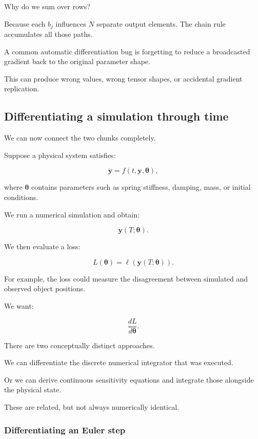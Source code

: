 Why do we sum over rows?

Because each \(b_j\) influences \(N\) separate output elements. The chain rule accumulates all those paths.

A common automatic differentiation bug is forgetting to reduce a broadcasted gradient back to the original parameter shape.

This can produce wrong values, wrong tensor shapes, or accidental gradient replication.

\subsection{Differentiating a simulation through time}\label{02-foundations-ii-ch022-differentiating-a-simulation-through-time}

We can now connect the two chunks completely.

Suppose a physical system satisfies:

\[
\dot{\mathbf y}=f(t,\mathbf y,\boldsymbol\theta),
\]

where \(\boldsymbol\theta\) contains parameters such as spring stiffness, damping, mass, or initial conditions.

We run a numerical simulation and obtain:

\[
\mathbf y(T;\boldsymbol\theta).
\]

We then evaluate a loss:

\[
L(\boldsymbol\theta) = \ell(\mathbf y(T;\boldsymbol\theta)).
\]

For example, the loss could measure the disagreement between simulated and observed object positions.

We want:

\[
\boxed{\frac{dL}{d\boldsymbol\theta}}.
\]

There are two conceptually distinct approaches.

We can differentiate the discrete numerical integrator that was executed.

Or we can derive continuous sensitivity equations and integrate those alongside the physical state.

These are related, but not always numerically identical.

\subsubsection{Differentiating an Euler step}\label{02-foundations-ii-ch022-differentiating-an-euler-step}

